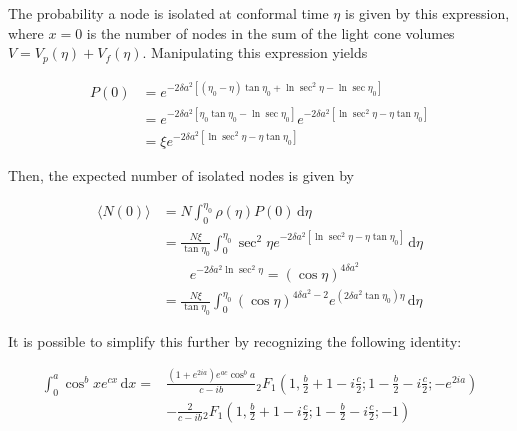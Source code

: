\documentclass[preprint,notitlepage,amsmath,amssymb,floatfix]{revtex4-1}
\begin{document}
\noindent The probability a node is isolated at conformal time $\eta$ is given by this expression, where $x=0$ is the number of nodes in the sum of the light cone volumes $V=V_p\left(\eta\right)+V_f\left(\eta\right)$.  
Manipulating this expression yields

\begin{equation}
\begin{split}
P\left(0\right) &= e^{-2\delta a^2\left[\left(\eta_0-\eta\right)\tan\eta_0 + \ln\sec^2\eta - \ln\sec\eta_0\right]} \\
  &= e^{-2\delta a^2\left[\eta_0\tan\eta_0 - \ln\sec\eta_0\right]}e^{-2\delta a^2\left[\ln\sec^2\eta - \eta\tan\eta_0\right]} \\
  &=\xi e^{-2\delta a^2\left[\ln\sec^2\eta-\eta\tan\eta_0\right]}
\end{split}
\end{equation}

\noindent Then, the expected number of isolated nodes is given by

\begin{equation}
\begin{split}
\langle N\left(0\right)\rangle &= N\int_0^{\eta_0}\!\rho\left(\eta\right)P\left(0\right)\,\mathrm d\eta \\
  &= \frac{N\xi}{\tan\eta_0}\int_0^{\eta_0}\!\sec^2\eta e^{-2\delta a^2\left[\ln\sec^2\eta - \eta\tan\eta_0\right]}\,\mathrm d\eta \\
  &\qquad e^{-2\delta a^2\ln\sec^2\eta} = \left(\cos\eta\right)^{4\delta a^2} \\
  &= \frac{N\xi}{\tan\eta_0}\int_0^{\eta_0}\left(\cos\eta\right)^{4\delta a^2 - 2} e^{\left(2\delta a^2 \tan\eta_0\right)\eta}\,\mathrm d\eta
\end{split}
\end{equation}

\noindent It is possible to simplify this further by recognizing the following identity:

\begin{equation}
\begin{split}
\int_0^a\!\cos^bxe^{cx}\,\mathrm dx = &\frac{\left(1+e^{2ia}\right)e^{ac}\cos^ba}{c-ib} {}_2F_1\left(1,\frac{b}{2}+1-i\frac{c}{2};1-\frac{b}{2}-i\frac{c}{2};-e^{2ia}\right) \\
& - \frac{2}{c-ib} {}_2F_1\left(1,\frac{b}{2}+1-i\frac{c}{2};1-\frac{b}{2}-i\frac{c}{2};-1\right)
\end{split}
\end{equation}
\end{document}
